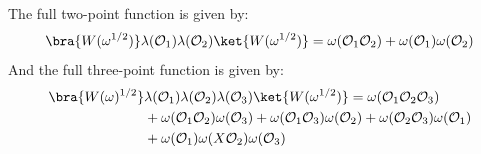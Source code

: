 \documentclass[a4paper,11pt]{article}
\theoremstyle{definition}
\numberwithin{equation}{section}
\begin{document}
The full two-point function is given by:
\begin{equation}
    \bra{W(\omega^{1/2})}\lambda(\mathcal{O}_1)\lambda(\mathcal{O}_2)\ket{W(\omega^{1/2})} = \omega(\mathcal{O}_1\mathcal{O}_2) + \omega(\mathcal{O}_1)\omega(\mathcal{O}_2)
\end{equation}
And the full three-point function is given by:
\begin{align}
    \begin{split}
        \bra{W(\omega)^{1/2}}&\lambda(\mathcal{O}_1)\lambda(\mathcal{O}_2)\lambda(\mathcal{O}_3)\ket{W(\omega^{1/2})} =\omega(\mathcal{O}_1\mathcal{O}_2\mathcal{O}_3) \\&+\omega(\mathcal{O}_1\mathcal{O}_2)\omega(\mathcal{O}_3) +  \omega(\mathcal{O}_1\mathcal{O}_3)\omega(\mathcal{O}_2) +\omega(\mathcal{O}_2\mathcal{O}_3)\omega(\mathcal{O}_1) \\&+ \omega(\mathcal{O}_1)\omega(X\mathcal{O}_2)\omega(\mathcal{O}_3)
    \end{split}
\end{align}
\end{document}
